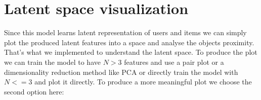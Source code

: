 \section{Latent space visualization}
Since this model learns latent representation of users and items we can simply plot the produced latent features into a space and analyse the objects proximity. That's what we implemented to understand the latent space. To produce the plot we can train the model to have $N > 3$ features and use a pair plot or a dimensionality reduction method like PCA or directly train the model with $N <= 3$ and plot it directly. To produce a more meaningful plot we choose the second option here:

